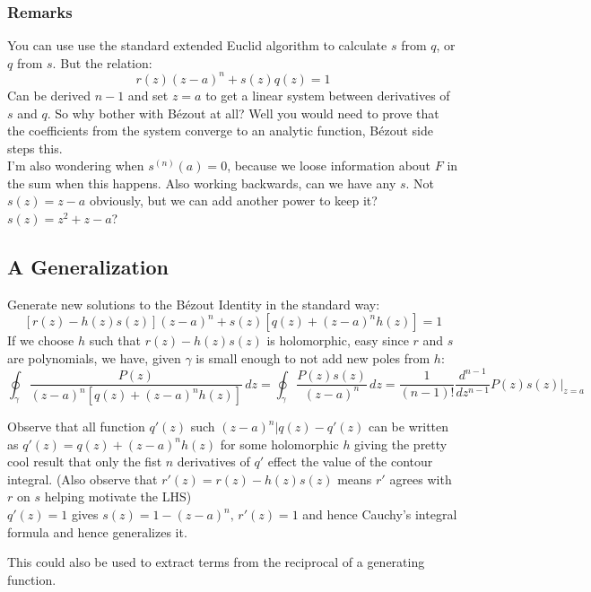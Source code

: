 \subsubsection{Remarks}
You can use use the standard extended Euclid algorithm to calculate $s$ from $q$, or $q$ from $s$.
But the relation:
\[r(z)(z-a)^n+s(z)q(z)=1\]
Can be derived $n-1$ and set $z=a$ to get a linear system between derivatives of $s$ and $q$.
So why bother with Bézout at all?
Well you would need to prove that the coefficients from the system converge to an analytic function,
Bézout side steps this.
\\

I'm also wondering when $s^{(n)}(a)=0$, because we loose information about $F$ in the sum when this happens.
Also working backwards, can we have any $s$.
Not $s(z) = z-a$ obviously, but we can add another power to keep it? 
$s(z) = z^2+z-a$?

\subsection{A Generalization}
Generate new solutions to the Bézout Identity in the standard way:
\[[r(z)-h(z)s(z)](z-a)^n+s(z)[q(z)+(z-a)^nh(z)]=1\]
If we choose $h$ such that $r(z)-h(z)s(z)$ is holomorphic,
easy since $r$ and $s$ are polynomials, we have, given $\gamma$ is small enough to not add new poles from $h$:
\[\oint_\gamma\frac{P(z)}{(z-a)^n[q(z)+(z-a)^nh(z)]}\,dz = \oint_\gamma \frac{P(z)s(z)}{(z-a)^n}\,dz= \frac{1}{(n-1)!}\frac{d^{n-1}}{dz^{n-1}}P(z)s(z)\bigg|_{z=a}\]

Observe that all function $q'(z)$ such $(z-a)^n | q(z)-q'(z)$ can be written as $q'(z) = q(z)+(z-a)^nh(z)$ for some holomorphic $h$ giving the pretty cool result that only the fist $n$ derivatives of $q'$ effect the value of the contour integral.
(Also observe that $r'(z) = r(z)-h(z)s(z)$ means $r'$ agrees  with $r$ on $s$ helping motivate the LHS)
\\

$q'(z)=1$ gives $s(z)=1-(z-a)^n,\,r'(z)=1$ and hence Cauchy's integral formula and hence generalizes it.

This could also  be used to extract terms from the reciprocal of a generating function.

